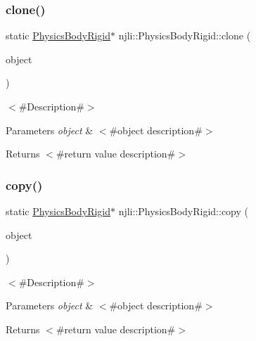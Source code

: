 \subsubsection{\texorpdfstring{clone()}{clone()}}
{\footnotesize\ttfamily static \mbox{\hyperlink{classnjli_1_1_physics_body_rigid}{Physics\+Body\+Rigid}}$\ast$ njli\+::\+Physics\+Body\+Rigid\+::clone (\begin{DoxyParamCaption}\item[{const \mbox{\hyperlink{classnjli_1_1_physics_body_rigid}{Physics\+Body\+Rigid}} \&}]{object }\end{DoxyParamCaption})\hspace{0.3cm}{\ttfamily [static]}}

$<$\#\+Description\#$>$


\begin{DoxyParams}{Parameters}
{\em object} & $<$\#object description\#$>$\\
\hline
\end{DoxyParams}
\begin{DoxyReturn}{Returns}
$<$\#return value description\#$>$ 
\end{DoxyReturn}
\mbox{\label{classnjli_1_1_physics_body_rigid_a7e1f73eba8cbf9860638b600f292eaee}} 
\subsubsection{\texorpdfstring{copy()}{copy()}}
{\footnotesize\ttfamily static \mbox{\hyperlink{classnjli_1_1_physics_body_rigid}{Physics\+Body\+Rigid}}$\ast$ njli\+::\+Physics\+Body\+Rigid\+::copy (\begin{DoxyParamCaption}\item[{const \mbox{\hyperlink{classnjli_1_1_physics_body_rigid}{Physics\+Body\+Rigid}} \&}]{object }\end{DoxyParamCaption})\hspace{0.3cm}{\ttfamily [static]}}

$<$\#\+Description\#$>$


\begin{DoxyParams}{Parameters}
{\em object} & $<$\#object description\#$>$\\
\hline
\end{DoxyParams}
\begin{DoxyReturn}{Returns}
$<$\#return value description\#$>$ 
\end{DoxyReturn}
\mbox{\label{classnjli_1_1_physics_body_rigid_a9cb801c257f66cf5c58dea67b10115e6}} 
